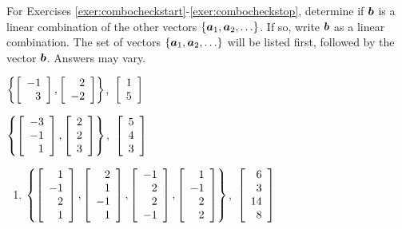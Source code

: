 \noindent For Exercises \ref{exer:combocheckstart}-\ref{exer:combocheckstop}, determine if $\bb b$ is a linear combination of the other vectors $\{\bb a_1, \bb a_2, \ldots\}$. If so, write $\bb b$ as a linear combination. The set of vectors $\{\bb a_1, \bb a_2,\ldots\}$ will be listed first, followed by the vector $\bb b$. Answers may vary. 
\begin{enumerate}[!HW!, label=$\spadesuit$ \arabic*., ref=\arabic*]
\begin{multicols}{2}
\item\label{exer:combocheckstart}  $\left\{\vr{-1\\3}, \vr{2\\-2}\right\}$,\ $\vr{1\\5}$ %
\item $\left\{\vr{-3\\-1\\1}, \vr{2\\2\\3}\right\}$,\ $\vr{5\\4\\3}$  %
\end{multicols}
\end{enumerate}
\begin{enumerate}[!HW!]
\item\label{exer:combocheckstop} $\left\{\vr{1\\-1\\2\\1}, \vr{2\\1\\-1\\1}, \vr{-1\\2\\2\\-1}, \vr{1\\-1\\2\\2}\right\}$,\ $\vr{6\\3\\14\\8}$ %
\end{enumerate}

